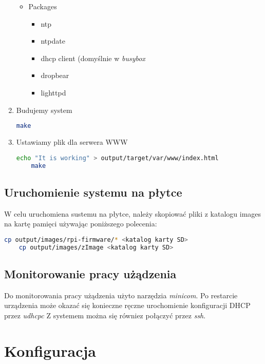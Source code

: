 \begin{enumerate}
\begin{itemize}
		\item Packages 
		\begin{itemize}
			\item ntp
			\item ntpdate
			\item dhcp client (domyślnie w \emph{busybox}
			\item dropbear 
			\item lighttpd
		\end{itemize}
	\end{itemize}
	\item Budujemy system
	\begin{lstlisting}[language=bash]
	make
	\end{lstlisting}	
	\item Ustawiamy plik dla serwera WWW
	\begin{lstlisting}[language=bash]
	echo "It is working" > output/target/var/www/index.html
	make 
	\end{lstlisting}	
\end{enumerate}

\subsection{Uruchomienie systemu na płytce}
W celu uruchomiena sustemu na płytce, należy skopiować pliki z katalogu images na kartę pamięci używając poniższego polecenia:
	\begin{lstlisting}[language=bash]
	cp output/images/rpi-firmware/* <katalog karty SD>
	cp output/images/zImage <katalog karty SD>
	\end{lstlisting}	
	
\subsection{Monitorowanie pracy użądzenia}
Do monitorowania pracy użądzenia użyto narzędzia \emph{minicom}. Po restarcie urządzenia może okazać się konieczne ręczne urochomienie konfiguracji DHCP przez \emph{udhcpc}
Z systemem można się równiez połączyć przez \emph{ssh}.


\section{Konfiguracja}

